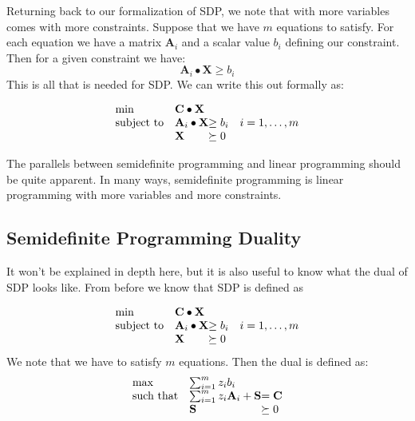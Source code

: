 \documentclass{article}
\begin{document}
Returning back to our formalization of SDP, we note that with more variables comes with more constraints. Suppose that we have \( m \) equations to satisfy. For each equation we have a matrix \( \mathbf{A}_i \) and a scalar value \( b_i \) defining our constraint. Then for a given constraint we have:
\[
\mathbf{A}_i \bullet \mathbf{X} \geq b_i
\]
This is all that is needed for SDP. We can write this out formally as:

\begin{align*}
  \begin{array}{ll@{}ll}
  \min              & \mathbf{C} \bullet \mathbf{X}                   & \\
  \text{subject to} & \mathbf{A}_i \bullet \mathbf{X} &\geq b_i       & i=1 ,\dots, m\\
                    & \mathbf{X}                      &\succeq 0
  \end{array}
\end{align*}

The parallels between semidefinite programming and linear programming should be quite apparent.
In many ways, semidefinite programming is linear programming with more variables and more constraints.
\subsection{Semidefinite Programming Duality}
It won't be explained in depth here, but it is also useful to know what the dual of SDP looks like. From before we know that SDP is defined as

\begin{align*}
  \begin{array}{ll@{}ll}
  \min              & \mathbf{C} \bullet \mathbf{X}                   & \\
  \text{subject to} & \mathbf{A}_i \bullet \mathbf{X} &\geq b_i       & i=1 ,\dots, m\\
                    & \mathbf{X}                      &\succeq 0
  \end{array}
\end{align*}
We note that we have to satisfy \( m \) equations. Then the dual is defined as:
\begin{align*}
  \begin{array}{ll@{}ll}
    \max              & \sum_{i=1}^m z_i b_i                              & \\
    \text{such that}  & \sum_{i=1}^m z_i \mathbf{A}_{i} + \mathbf{S} &= \mathbf{C} \\
                    & \mathbf{S}                      &\succeq 0
  \end{array}
\end{align*}
\end{document}
